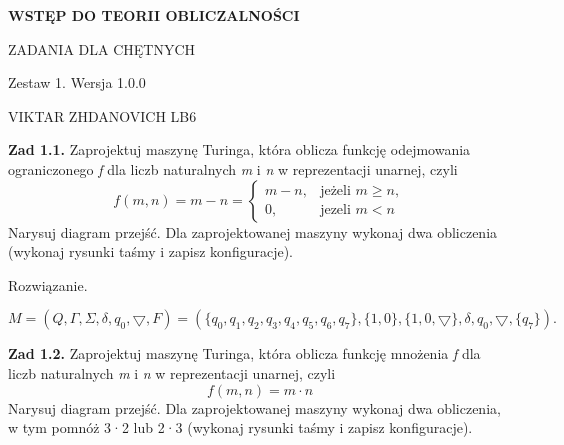 \documentclass[12pt]{article}
\begin{document}
\begin{titlepage}
	\begin{center}
		{\LARGE\bfseries WSTĘP DO TEORII 			OBLICZALNOŚCI\par}
		\vspace{3cm}
		ZADANIA DLA CHĘTNYCH \par
		Zestaw 1. Wersja 1.0.0 \par
	\end{center}
	\vfill\centering VIKTAR ZHDANOVICH LB6 \par
\end{titlepage}

\newpage

\noindent\textbf{Zad 1.1.} Zaprojektuj  maszynę  Turinga,  która  oblicza  funkcję  odejmowania ograniczonego \textit{f} dla liczb naturalnych \textit{m} i \textit{n} w reprezentacji unarnej, czyli
\[ f(m,n) = m - n = 
  \begin{cases}
   	m - n, & \text{jeżeli } m \geq n, \\
   	0, & \text{jezeli } m < n
  \end{cases}
\]
Narysuj diagram przejść. Dla zaprojektowanej maszyny wykonaj dwa obliczenia (wykonaj rysunki taśmy i zapisz konfiguracje).

 Rozwiązanie.
 
\[M=(Q,\Gamma,\Sigma,\delta,q_0,\bigtriangledown,F)=(\{q_0,q_1,q_2,q_3,q_4,q_5,q_6,q_7\},\{1,0\},\{1,0,\bigtriangledown\},\delta,q_0,\bigtriangledown,\{q_7\}).\]

\vspace{20pt}

\begin{center}
\end{center}

\newpage
\noindent\textbf{Zad 1.2.} Zaprojektuj maszynę Turinga, która oblicza funkcję mnożenia \textit{f} dla liczb naturalnych \textit{m} i \textit{n} w reprezentacji unarnej, czyli
\[f(m,n)=m \cdot n\]
Narysuj diagram przejść. Dla zaprojektowanej maszyny wykonaj dwa obliczenia, w tym pomnóż 3·2 lub 2·3 (wykonaj rysunki taśmy i zapisz konfiguracje).
\end{document}
